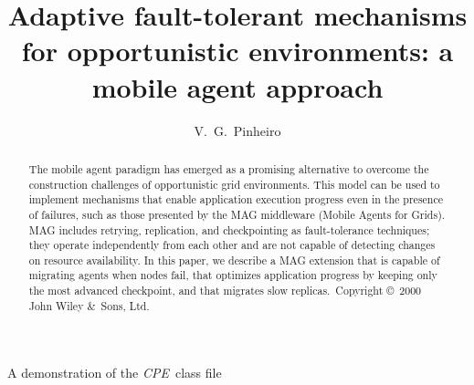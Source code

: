 \documentclass{cpeauth}
\begin{document}
\def\cop{Copyright \copyright\ 2000 John Wiley \&\ Sons, Ltd.}


 {A demonstration of the
\emph{CPE}\ class file}

\title{Adaptive fault-tolerant mechanisms for opportunistic environments: a mobile agent approach\footnotemark[3]}

\author{V.~G.~Pinheiro\corrauth\comma\footnotemark[2]}







\noaccepted{}

\begin{abstract}
The mobile agent paradigm has emerged as a promising alternative to overcome
the construction challenges of opportunistic grid environments.
This model can be used to implement mechanisms that enable
application execution progress even in the presence of failures, such as
those presented by the MAG middleware (Mobile Agents for Grids). 
MAG includes retrying, replication, and checkpointing as
fault-tolerance techniques; they operate independently from
each other and are not capable of detecting changes on resource availability.
In this paper, we describe a MAG extension that is capable of migrating agents when 
nodes fail, that optimizes application progress by keeping only the most advanced 
checkpoint, and that migrates slow replicas.~\cop
\end{abstract}
\end{document}
